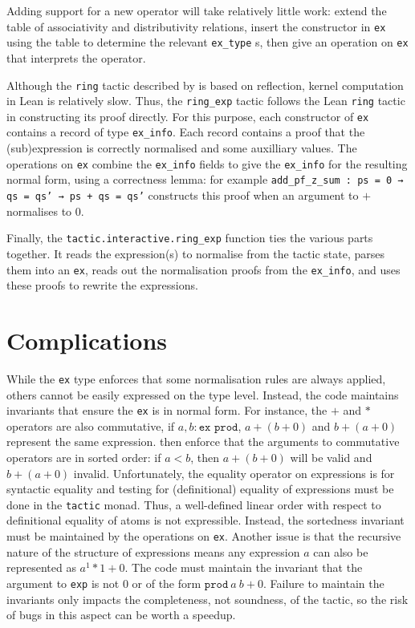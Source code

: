\documentclass{llncs}
\newcommand{\lean}[1]{\texttt{#1}\xspace} %
\newcommand{\ex}{\lean{ex}}
\newcommand{\ringexp}{\lean{ring\_exp}}
\begin{document}
Adding support for a new operator will take relatively little work:
extend the table of associativity and distributivity relations,
insert the constructor in \ex using the table to determine the relevant \lean{ex\_type}s,
then give an operation on \ex that interprets the operator.

Although the \lean{ring} tactic described by \citeauthor{ring-tactic} is based on reflection,
kernel computation in Lean is relatively slow.
Thus, the \ringexp tactic follows the Lean \lean{ring} tactic in constructing its proof directly.
For this purpose, each constructor of \ex contains a record of type \lean{ex\_info}.
Each record contains a proof that the (sub)expression is correctly normalised and some auxilliary values.
The operations on \ex combine the \lean{ex\_info} fields to give the \lean{ex\_info} for the resulting normal form,
using a correctness lemma: for example \lean{add\_pf\_z\_sum : ps = 0 → qs = qs' → ps + qs = qs'} constructs this proof when an argument to $+$ normalises to $0$.

Finally, the \lean{tactic.interactive.ring\_exp} function ties the various parts together.
It reads the expression(s) to normalise from the tactic state,
parses them into an \ex,
reads out the normalisation proofs from the \lean{ex\_info},
and uses these proofs to rewrite the expressions.

\section{Complications}

While the \ex type enforces that some normalisation rules are always applied,
others cannot be easily expressed on the type level.
Instead, the code maintains invariants that ensure the \ex is in normal form.
For instance, the $+$ and $*$ operators are also commutative,
if $a, b : \lean{ex prod}$, $a + (b + 0)$ and $b + (a + 0)$ represent the same expression.
then enforce that the arguments to commutative operators are in sorted order:
if $a < b$, then $a + (b + 0)$ will be valid and $b + (a + 0)$ invalid. 
Unfortunately, the equality operator on expressions is for syntactic equality and
testing for (definitional) equality of expressions must be done in the \lean{tactic} monad.
Thus, a well-defined linear order with respect to definitional equality of atoms is not expressible.
Instead, the sortedness invariant must be maintained by the operations on \ex.
Another issue is that the recursive nature of the structure of expressions
means any expression $a$ can also be represented as $a^1*1 + 0$.
The code must maintain the invariant that the argument to \lean{exp} is not $0$ or of the form $\lean{prod}\ a\ b + 0$.
Failure to maintain the invariants only impacts the completeness, not soundness, of the tactic,
so the risk of bugs in this aspect can be worth a speedup.
\end{document}
